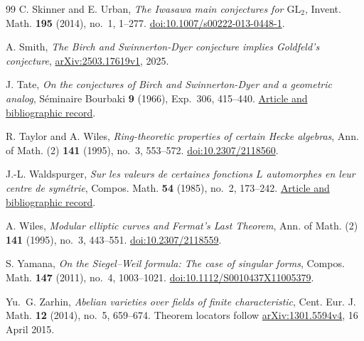 \begin{thebibliography}{99}
C. Skinner and E. Urban,
\emph{The Iwasawa main conjectures for $\mathrm{GL}_2$},
Invent. Math. \textbf{195} (2014), no.~1, 1--277.
\href{https://doi.org/10.1007/s00222-013-0448-1}{doi:10.1007/s00222-013-0448-1}.

A. Smith,
\emph{The Birch and Swinnerton-Dyer conjecture implies
Goldfeld's conjecture},
\href{https://arxiv.org/abs/2503.17619v1}{arXiv:2503.\allowbreak17619v1}, 2025.

J. Tate,
\emph{On the conjectures of Birch and Swinnerton-Dyer
and a geometric analog},
S\'eminaire Bourbaki \textbf{9} (1966), Exp.~306, 415--440.
\href{https://www.numdam.org/item/SB_1964-1966__9__415_0/}{Article and bibliographic record}.

R. Taylor and A. Wiles,
\emph{Ring-theoretic properties of certain Hecke algebras},
Ann. of Math. (2) \textbf{141} (1995), no.~3, 553--572.
\href{https://doi.org/10.2307/2118560}{doi:10.2307/2118560}.

J.-L. Waldspurger,
\emph{Sur les valeurs de certaines fonctions $L$ automorphes
en leur centre de sym\'etrie},
Compos. Math. \textbf{54} (1985), no.~2, 173--242.
\href{https://www.numdam.org/item/CM_1985__54_2_173_0/}{Article and bibliographic record}.

A. Wiles,
\emph{Modular elliptic curves and Fermat's Last Theorem},
Ann. of Math. (2) \textbf{141} (1995), no.~3, 443--551.
\href{https://doi.org/10.2307/2118559}{doi:10.2307/2118559}.

S. Yamana,
\emph{On the Siegel--Weil formula: The case of singular forms},
Compos. Math. \textbf{147} (2011), no.~4, 1003--1021.
\href{https://doi.org/10.1112/S0010437X11005379}{doi:10.1112/S0010437X11005379}.

Yu.~G. Zarhin,
\emph{Abelian varieties over fields of finite characteristic},
Cent. Eur. J. Math. \textbf{12} (2014), no.~5, 659--674.
Theorem locators follow
\href{https://arxiv.org/abs/1301.5594v4}{arXiv:1301.5594v4},
16 April 2015.

\end{thebibliography}
